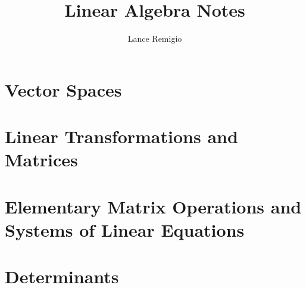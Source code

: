 \documentclass[11pt,a4paper]{book}
\title{Linear Algebra Notes}
\author{Lance Remigio}
\begin{document}
\maketitle
\tableofcontents
\listoftheorems[ignoreall,show={theorem,defn}]
\chapter{Vector Spaces}











\chapter{Linear Transformations and Matrices}











\chapter{Elementary Matrix Operations and Systems of Linear Equations}





\chapter{Determinants}




\end{document}
